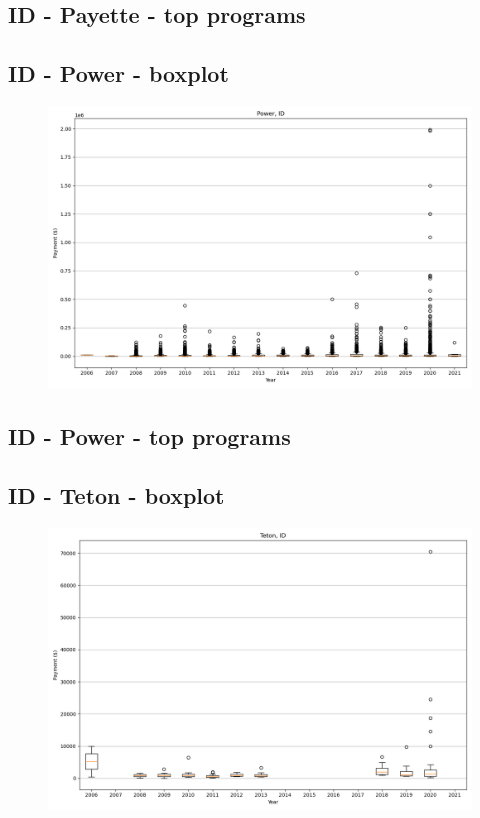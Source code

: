 \subsection*{ID - Payette - top programs}

\newpage
\subsection*{ID - Power - boxplot}
\begin{figure}[h]
\centering
\includegraphics[width=7in]{../output/boxplots/counties/Power-ID_boxplot.png}
\end{figure}


\subsection*{ID - Power - top programs}

\newpage
\subsection*{ID - Teton - boxplot}
\begin{figure}[h]
\centering
\includegraphics[width=7in]{../output/boxplots/counties/Teton-ID_boxplot.png}
\end{figure}


